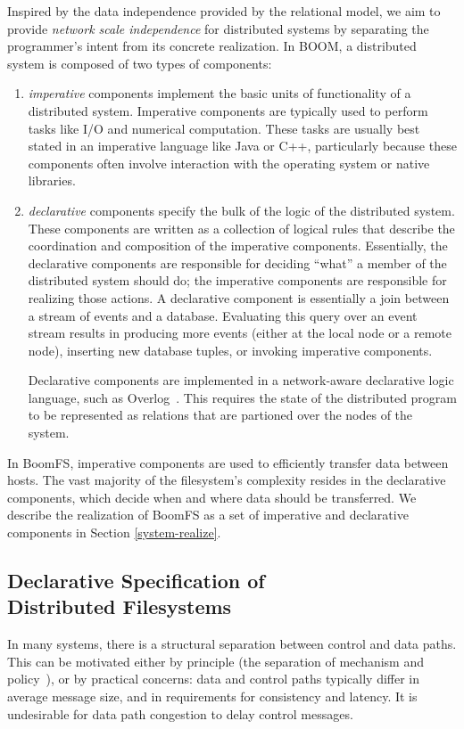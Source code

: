 \documentclass[twocolumn]{article}
\begin{document}
Inspired by the data independence provided by the relational model, we
aim to provide \emph{network scale independence} for distributed
systems by separating the programmer's intent from its concrete
realization. In BOOM, a distributed system is composed of two types of
components:
\begin{enumerate}
\item
  \emph{imperative} components implement the basic units of
  functionality of a distributed system. Imperative components are
  typically used to perform tasks like I/O and numerical
  computation. These tasks are usually best stated in an imperative
  language like Java or C++, particularly because these components
  often involve interaction with the operating system or native
  libraries.

\item
  \emph{declarative} components specify the bulk of the logic of the
  distributed system. These components are written as a collection of
  logical rules that describe the coordination and composition of the
  imperative components. Essentially, the declarative components are
  responsible for deciding ``what'' a member of the distributed system
  should do; the imperative components are responsible for realizing
  those actions. A declarative component is essentially a join between
  a stream of events and a database. Evaluating this query over an
  event stream results in producing more events (either at the local
  node or a remote node), inserting new database tuples, or invoking
  imperative components.

  Declarative components are implemented in a network-aware
  declarative logic language, such as Overlog~\cite{dn-sigmod}. This
  requires the state of the distributed program to be represented as
  relations that are partioned over the nodes of the system.
\end{enumerate}

In BoomFS, imperative components are used to efficiently transfer data
between hosts. The vast majority of the filesystem's complexity
resides in the declarative components, which decide when and where
data should be transferred. We describe the realization of BoomFS as a
set of imperative and declarative components in Section
\ref{system-realize}.

\subsection{Declarative Specification of\\Distributed Filesystems}
In many systems, there is a structural separation between control and
data paths. This can be motivated either by principle (the separation
of mechanism and policy~\cite{hydra-policy-mech-sep}), or by practical
concerns: data and control paths typically differ in average message
size, and in requirements for consistency and latency. It is
undesirable for data path congestion to delay control messages.
\end{document}
